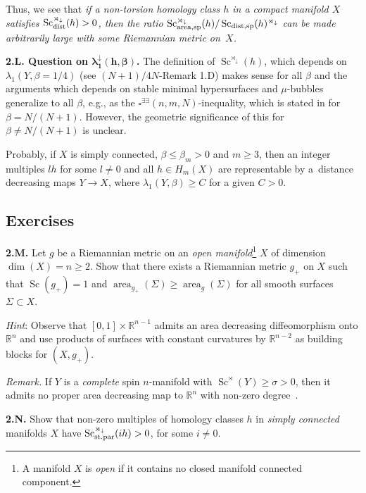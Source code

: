 \documentclass[pdftex]{sigma}
\numberwithin{equation}{section}
\begin{document}
Thus, we see that
 {\it if a non-torsion homology class $h$ in a compact manifold $X$ satisfies
 $\operatorname{Sc}_{\rm dist}^{\rtimes_\downarrow}(h)>0$, then the ratio
 $\operatorname{Sc}^{\rtimes_\downarrow}_{{\rm area,sp}}(h)/\operatorname{Sc}_{{\rm dist,sp}}(h)^{\rtimes_\downarrow}$
 can be made arbitrarily large with some Riemannian metric on~$X$.}

\textbf{2.L. Question on $\boldsymbol{\lambda^\downarrow_1(h,\beta)}$.} The definition
of $\operatorname{Sc}^{\rtimes_\downarrow}(h)$, which depends on $\lambda_1(Y,\beta=1/4)$
(see $(N + 1)/4N$-Remark 1.D) makes sense for all $\beta$ and the arguments which depends on stable minimal hypersurfaces and $\mu$-bubbles generalize to all $\beta$, e.g., as the $\square^{\exists \exists}(n, m,N)$-inequality, which is stated in \cite[\S2.B]{Gr2023} for $\beta=N/(N+1)$. However, the geometric significance of this for
$\beta\neq N/(N+1)$ is unclear.

Probably, if $X$ is simply connected, $\beta \leq \beta_m>0$ and $m\geq 3$, then an integer multiples
$lh$ for some $l\neq 0$ and all $h\in H_m(X)$ are representable by a~distance decreasing maps $Y\to X$, where $\lambda_1(Y, \beta)\geq C$ for a given $C>0$.

\subsection*{Exercises}

 \textbf{2.M.} Let $g$
be a Riemannian metric on an {\it open manifold}\footnote{A manifold $X$ is \emph{open} if it contains no closed manifold connected component.} $X$ of dimension $\dim(X)=n\geq 2$. Show that there exists a Riemannian metric $g_+$ on $X$ such that $\operatorname{Sc}(g_+)=1$ and $\operatorname{area}_{g_+} (\Sigma)\geq \operatorname{area}_{g} (\Sigma)$ for all smooth surfaces $\Sigma\subset X$.

{\it Hint}: Observe that $[0,1]\times \mathbb R^{n-1}$ admits an area decreasing diffeomorphism onto
$\mathbb R^n$ and
use products of surfaces with constant curvatures by $\mathbb R^{n-2}$ as building blocks for $(X,g_+)$.

 {\it Remark.} If $Y$ is a {\it complete} spin $n$-manifold with $\operatorname{Sc}^\rtimes (Y) \geq \sigma>0$, then it admits no proper area decreasing map to $\mathbb R^n $ with non-zero degree~\cite{GL1983}.

 \textbf {2.N.} Show that non-zero multiples of homology classes $h$ in {\it simply connected} manifolds $X$
 have $\operatorname{Sc}_{{\rm st.par}}^{\rtimes_\downarrow}(ih)>0$, for some $i\neq 0$.
\end{document}
